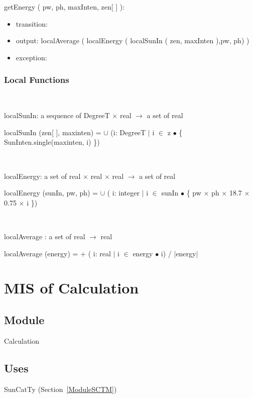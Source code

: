 \documentclass[12pt, titlepage]{article}
\begin{document}
\noindent  getEnergy ( pw, ph, maxInten, zen[ ] ):
\begin{itemize}
\item transition:
\item output:  localAverage ( localEnergy ( localSunIn ( zen, maxInten ),pw, ph) )
\item exception: 
\end{itemize}


\subsubsection{Local Functions}

~\newline

localSunIn: a sequence of DegreeT $\times$ real $\rightarrow$ a set of real

localSunIn (zen[ ], maxinten) = $\cup$ (i: DegreeT $|$ i $\in$ z $\bullet$ \{ SunInten.single(maxinten, i) \})

~\newline

localEnergy: a set of real $\times$ real $\times$ real $\rightarrow$ a set of real

localEnergy (sunIn, pw, ph) =  $\cup$ ( i: integer $|$ i $\in$ sunIn $\bullet$ \{ pw $\times$ ph $\times$ 18.7 $\times$ 0.75 $\times$ i \})

~\newline

localAverage : a set of real $\rightarrow$ real

localAverage (energy) =  + ( i: real $|$ i $\in$ energy $\bullet$  i) / $|$energy$|$

\newpage


\section{MIS of Calculation} \label{ModuleC} 

\subsection{Module}
Calculation\\


\subsection{Uses}
SunCatTy (Section~\ref{ModuleSCTM}) \\
\end{document}
